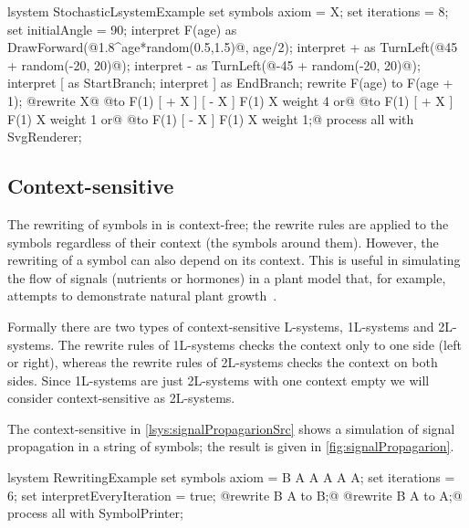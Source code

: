 \begin{Lsystem}[label=lsys:randExample,caption={Stochastic \lsystem with randomized interpretation of symbols and rewrite rule replacements}]
lsystem StochasticLsystemExample {
	set symbols axiom = X;
	set iterations = 8;
	set initialAngle = 90;
	interpret F(age) as DrawForward(@1.8^age*random(0.5,1.5)@, age/2);
	interpret + as TurnLeft(@45 + random(-20, 20)@);
	interpret - as TurnLeft(@-45 + random(-20, 20)@);
	interpret [ as StartBranch;
	interpret ] as EndBranch;
	rewrite F(age) to F(age + 1);
	@rewrite X@
		@to F(1) [ + X ] [ - X ] F(1) X  weight 4 or@
		@to F(1) [ + X ]         F(1) X  weight 1 or@
		@to F(1)         [ - X ] F(1) X  weight 1;@
}
process all with SvgRenderer;
\end{Lsystem}


\subsection{Context-sensitive \lsystems}

\newcommand{\onelsystems}{\mbox{1L-systems}\xspace}
\newcommand{\twolsystems}{\mbox{2L-systems}\xspace}

The rewriting of symbols in \zerolsystems is context-free; the rewrite rules are applied to the symbols regardless of their context (the symbols around them).
However, the rewriting of a symbol can also depend on its context.
This is useful in simulating the flow of signals (nutrients or hormones) in a plant model that, for example, attempts to demonstrate natural plant growth~\citep{PL91}.

Formally there are two types of context-sensitive L-systems, \onelsystems and \twolsystems.
The rewrite rules of \onelsystems checks the context only to one side (left or right), whereas the rewrite rules of \twolsystems checks the context on both sides.
Since \onelsystems are just \twolsystems with one context empty we will consider context-sensitive \lsystems as \twolsystems.

The context-sensitive \lsystem in \autoref{lsys:signalPropagarionSrc} shows a simulation of signal propagation in a string of symbols; the result is given in \autoref{fig:signalPropagarion}.

\begin{Lsystem}[label=lsys:signalPropagarionSrc,caption={Context-sensitive \lsystem simulating signal propagation}]
lsystem RewritingExample {
	set symbols axiom = B A A A A A;
	set iterations = 6;
	set interpretEveryIteration = true;
	@rewrite {B} A     to B;@
	@rewrite     B {A} to A;@
}
process all with SymbolPrinter;
\end{Lsystem}

